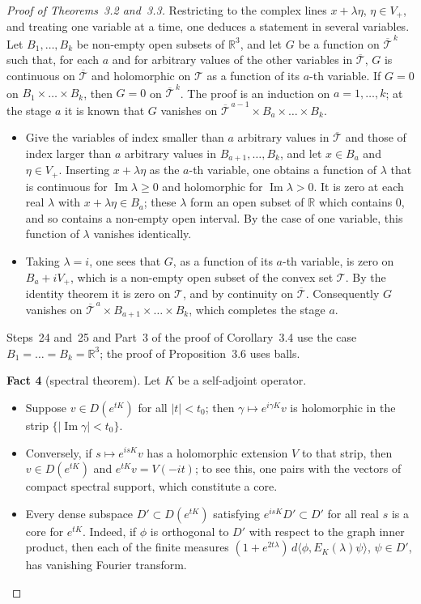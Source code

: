 \documentclass[11pt]{amsart}
\theoremstyle{definition}
\begin{document}
\begin{proof}[Proof of Theorems~3.2 and~3.3]
Restricting to the complex lines $x+\lambda\eta$, $\eta\in V_+$, and treating one variable at a time, one deduces a statement in several variables.
Let $B_1,\dots,B_k$ be non-empty open subsets of $\mathbb R^3$, and let $G$ be a function on $\overline{\mathcal T}^{\,k}$ such that, for each $a$ and for arbitrary values of the other variables in $\overline{\mathcal T}$, $G$ is continuous on $\overline{\mathcal T}$ and holomorphic on $\mathcal T$ as a function of its $a$-th variable.
If $G=0$ on $B_1\times\dots\times B_k$, then $G=0$ on $\overline{\mathcal T}^{\,k}$.
The proof is an induction on $a=1,\dots,k$; at the stage $a$ it is known that $G$ vanishes on $\overline{\mathcal T}^{\,a-1}\times B_a\times\dots\times B_k$.
\begin{itemize}
\item[(1)] Give the variables of index smaller than $a$ arbitrary values in $\overline{\mathcal T}$ and those of index larger than $a$ arbitrary values in $B_{a+1},\dots,B_k$, and let $x\in B_a$ and $\eta\in V_+$.
Inserting $x+\lambda\eta$ as the $a$-th variable, one obtains a function of $\lambda$ that is continuous for $\operatorname{Im}\lambda\ge0$ and holomorphic for $\operatorname{Im}\lambda>0$.
It is zero at each real $\lambda$ with $x+\lambda\eta\in B_a$; these $\lambda$ form an open subset of $\mathbb R$ which contains $0$, and so contains a non-empty open interval.
By the case of one variable, this function of $\lambda$ vanishes identically.
\item[(2)] Taking $\lambda=i$, one sees that $G$, as a function of its $a$-th variable, is zero on $B_a+iV_+$, which is a non-empty open subset of the convex set $\mathcal T$.
By the identity theorem it is zero on $\mathcal T$, and by continuity on $\overline{\mathcal T}$.
Consequently $G$ vanishes on $\overline{\mathcal T}^{\,a}\times B_{a+1}\times\dots\times B_k$, which completes the stage $a$.
\end{itemize}
Steps~24 and~25 and Part~3 of the proof of Corollary~3.4 use the case $B_1=\dots=B_k=\mathbb R^3$; the proof of Proposition~3.6 uses balls.

\textbf{Fact 4} (spectral theorem).
Let $K$ be a self-adjoint operator.
\begin{itemize}
\item[(i)] Suppose $v\in D(e^{tK})$ for all $|t|<t_0$; then $\gamma\mapsto e^{i\gamma K}v$ is holomorphic in the strip $\{|\operatorname{Im}\gamma|<t_0\}$.
\item[(ii)] Conversely, if $s\mapsto e^{isK}v$ has a holomorphic extension $V$ to that strip, then $v\in D(e^{tK})$ and $e^{tK}v=V(-it)$; to see this, one pairs with the vectors of compact spectral support, which constitute a core.
\item[(iii)] Every dense subspace $D'\subset D(e^{tK})$ satisfying $e^{isK}D'\subset D'$ for all real $s$ is a core for $e^{tK}$.
Indeed, if $\phi$ is orthogonal to $D'$ with respect to the graph inner product, then each of the finite measures $(1+e^{2t\lambda})\,d\langle\phi,E_K(\lambda)\psi\rangle$, $\psi\in D'$, has vanishing Fourier transform.
\end{itemize}


\end{proof}
\end{document}
